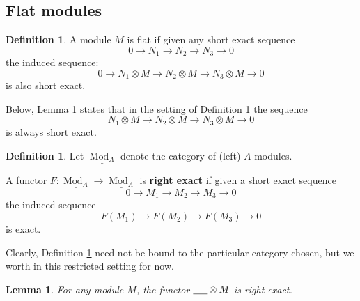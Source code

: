 \documentclass[12pt]{article}
\theoremstyle{plain}
\newtheorem{lemma}[thm]{Lemma}
\theoremstyle{definition}
\newtheorem{defn}[thm]{Definition} %
\newcommand{\und}[1]{\underline{\hspace{#1 cm}}}
\newcommand{\lto}{\longrightarrow}
\begin{document}
\subsection{Flat modules}
\begin{defn}\label{def:flat}
A module $M$ is flat if given any short exact sequence
\begin{equation}
0 \lto N_1 \lto N_2 \lto N_3 \lto 0
\end{equation}
the induced sequence:
\begin{equation}
0 \lto N_1 \otimes M \lto N_2 \otimes M \lto N_3 \otimes M \lto 0
\end{equation}
is also short exact.
\end{defn}
Below, Lemma \ref{lem:tensor_right_exact} states that in the setting of Definition \ref{def:flat} the sequence
\begin{equation}
N_1 \otimes M \lto N_2 \otimes M \lto N_3 \otimes M \lto 0
\end{equation}
is always short exact.
\begin{defn}\label{def:right_exact}
Let $\underline{\operatorname{Mod}_A}$ denote the category of (left) $A$-modules.

A functor $F: \underline{\operatorname{Mod}_A} \lto \underline{\operatorname{Mod}_A}$ is \textbf{right exact} if given a short exact sequence
\begin{equation}
0 \lto M_1 \lto M_2 \lto M_3 \lto 0
\end{equation}
the induced sequence
\begin{equation}
F(M_1) \lto F(M_2) \lto F(M_3) \lto 0
\end{equation}
is exact.
\end{defn}
Clearly, Definition \ref{def:right_exact} need not be bound to the particular category chosen, but we worth in this restricted setting for now.
\begin{lemma}\label{lem:tensor_right_exact}
For any module $M$, the functor $\und{0.5} \otimes M$ is right exact.
\end{lemma}
\end{document}
